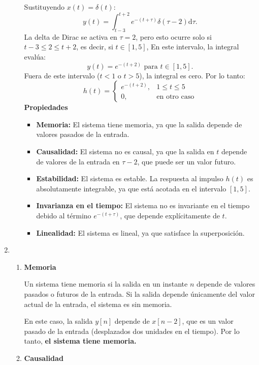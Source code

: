 \begin{enumerate}[label=\color{red}\textbf{\arabic*)}]
\begin{enumerate}[label=\color{red}\textbf{\alph*)}]
        Sustituyendo $x(t)=\delta(t)$:  \[
        y(t)=\int_{t-3}^{t+2}e^{-(t+\tau)}\delta(\tau-2)\mathrm{d}\tau.
        \] 
        La delta de Dirac se activa en $\tau=2$, pero esto ocurre solo si  $t-3\le 2\le t+2$, es decir, si $t\in [1,5]$, En este intervalo, la integral evalúa: \[
            y(t)=e^{-(t+2)}\text{ para } t\in [1,5].
        \] 
        Fuera de este intervalo ($t<1$ o $t>5$), la integral es cero. Por lo tanto: \[
        h(t)=\begin{cases}
            e^{-(t+2)} , & 1\le t\le 5\\
            0, & \text{en otro caso}
        \end{cases}
        \] 
        \textbf{Propiedades}
        \begin{itemize}[label=\textbullet]
            \item \textbf{Memoria:} El sistema tiene memoria, ya que la salida depende de valores pasados de la entrada.
            \item \textbf{Causalidad:} El sistema no es causal, ya que la salida en $t$ depende de valores de la entrada en  $\tau-2$, que puede ser un valor futuro.
            \item \textbf{Estabilidad:} El sistema es estable. La respuesta al impulso $h(t)$ es absolutamente integrable, ya que está acotada en el intervalo $[1,5]$.
            \item \textbf{Invarianza en el tiempo:} El sistema no es invariante en el tiempo debido al término $e^{-(t+\tau)} $, que depende explícitamente de $t$.
            \item \textbf{Linealidad:} El sistema es lineal, ya que satisface la superposición.
        \end{itemize}
  \end{enumerate}
\item {}
\begin{enumerate}[label=\textbf{\arabic*)}]
    \item \textbf{Memoria}

        Un sistema tiene memoria si la salida en un instante $n$ depende de valores pasados o futuros de la entrada. Si la salida depende únicamente del valor actual de la entrada, el sistema es sin memoria.

        En este caso, la salida $y[n]$ depende de $x[n-2]$, que es un valor pasado de la entrada (desplazados dos unidades en el tiempo). Por lo tanto, \textbf{el sistema tiene memoria.}
    \item \textbf{Causalidad}


\end{enumerate}
\end{enumerate}

